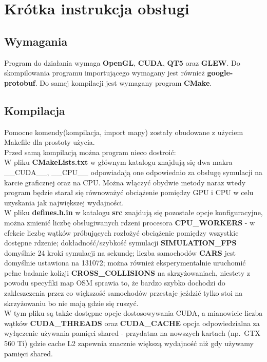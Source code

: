 \documentclass[12pt,leqno]{article}
\begin{document}
\section{Krótka instrukcja obsługi}
\subsection{Wymagania}
Program do działania wymaga \textbf{OpenGL}, \textbf{CUDA}, \textbf{QT5} oraz
\textbf{GLEW}. Do skompilowania programu importującego wymagany jest również
\textbf{google-protobuf}. Do samej kompilacji jest wymagany program \textbf{CMake}.

\subsection{Kompilacja}
Pomocne komendy(kompilacja, import mapy) zostały obudowane z użyciem Makefile
dla prostoty użycia. \\
Przed samą kompilacją można program nieco dostroić: \\
W pliku \textbf{CMakeLists.txt} w głównym katalogu znajdują się dwa makra
\_\_CUDA\_\_, \_\_CPU\_\_ odpowiadają one odpowiednio za obsługę symulacji
na karcie graficznej oraz na CPU. Można włączyć obydwie metody naraz wtedy
program będzie starał się równoważyć obciążenie pomiędzy GPU i CPU w celu
uzyskania jak największej wydajności. \\
W pliku \textbf{defines.h.in} w katalogu \textbf{src} znajdują się pozostałe
opcje konfiguracyjne, \\ można zmienić liczbę obsługiwanych rdzeni procesora
\textbf{CPU\_WORKERS} - w efekcie liczbę wątków próbujących rozłożyć
obciążenie pomiędzy wszystkie dostępne rdzenie; dokładność/szybkość
symulacji \textbf{SIMULATION\_FPS} domyślnie 24 kroki symulacji na sekundę;
liczba samochodów \textbf{CARS} jest domyślnie ustawiona na 131072;
można również eksperymentalnie uruchomić pełne badanie kolizji
\textbf{CROSS\_COLLISIONS} na skrzyżowaniach, niestety z powodu specyfiki
map OSM sprawia to, że bardzo szybko dochodzi do zakleszczenia przez co
większość samochodów przestaje jeździć tylko stoi na skrzyżowaniu bo nie
mają gdzie się ruszyć. \\
W tym pliku są także dostępne opcje dostosowywania CUDA, a mianowicie
liczba wątków \textbf{CUDA\_THREADS} oraz \textbf{CUDA\_CACHE} opcja
odpowiedzialna za wyłączenie używania pamięci shared - przydatna na
nowszych kartach (np.\ GTX 560 Ti) gdzie cache L2 zapewnia znacznie
większą wydajność niż gdy używamy pamięci shared. \\ \\
\end{document}
